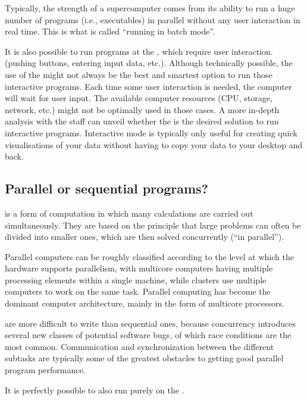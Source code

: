 Typically, the strength of a supercomputer comes from its ability to run a huge
number of programs (i.e., executables) in parallel without any user interaction
in real time. This is what is called ``running in batch mode''.

It is also possible to run programs at the \hpc, which require user
interaction. (pushing buttons, entering input data, etc.).  Although
technically possible, the use of the \hpc might not always be the best and
smartest option to run those interactive programs.  Each time some user
interaction is needed, the computer will wait for user input. The available
computer resources (CPU, storage, network, etc.) might not be optimally used in
those cases. A more in-depth analysis with the \hpc staff can unveil whether
the \hpc is the desired solution to run interactive programs.
Interactive mode is typically only useful for creating quick visualisations
of your data without having to copy your data to your desktop and back.

\subsection{Parallel or sequential programs?}
\label{sec:parallel-or-sequential-programs}

 is a form of computation in which many calculations
are carried out simultaneously. They are based on the principle that large
problems can often be divided into smaller ones, which are then solved
concurrently (``in parallel'').

Parallel computers can be roughly classified according to the level at which
the hardware supports parallelism, with multicore computers having multiple
processing elements within a single machine, while clusters use multiple
computers to work on the same task. Parallel computing has become the dominant
computer architecture, mainly in the form of multicore processors.

 are more difficult to write than sequential ones,
because concurrency introduces several new classes of potential software bugs,
of which race conditions are the most common. Communication and synchronization
between the different subtasks are typically some of the greatest obstacles to
getting good parallel program performance.

It is perfectly possible to also run purely  on the
\hpc.

